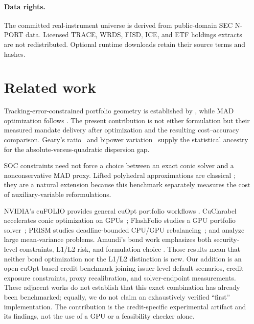 \documentclass[11pt,a4paper]{article}
\begin{document}
\paragraph{Data rights.} The committed real-instrument universe is derived
from public-domain SEC N-PORT data. Licensed TRACE, WRDS, FISD, ICE, and ETF
holdings extracts are not redistributed. Optional runtime downloads retain
their source terms and hashes.

\section{Related work}

Tracking-error-constrained portfolio geometry is established by
\citet{jorion2003tracking}, while MAD optimization follows
\citet{konno1991mad}. The present contribution is not either formulation but
their measured mandate delivery after optimization and the resulting
cost--accuracy comparison. Geary's ratio~\citep{geary1935ratio} and bipower
variation~\citep{barndorff2004bipower} supply the statistical ancestry for the
absolute-versus-quadratic dispersion gap.

SOC constraints need not force a choice between an exact conic solver and a
nonconservative MAD proxy. Lifted polyhedral approximations are classical
\citep{bental2001soc,vielma2008lifted}; they are a natural extension because
this benchmark separately measures the cost of auxiliary-variable
reformulations.

NVIDIA's cuFOLIO provides general cuOpt portfolio workflows
\citep{nvidia2026cufolio}. CuClarabel accelerates conic
optimization on GPUs~\citep{chen2024cuclarabel}; FlashFolio studies a GPU
portfolio solver~\citep{jiang2026flashfolio}; PRISM studies deadline-bounded
CPU/GPU rebalancing~\citep{ghosh2026prism}; and \citet{niu2026meanvariance}
analyze large mean-variance problems. Amundi's bond work emphasizes both
security-level constraints, L1/L2 risk, and formulation choice
\citep{benslimane2026bond,benslimane2023bondmip}. Those results mean that
neither bond optimization nor the L1/L2 distinction is new. Our addition is
an open cuOpt-based credit benchmark joining issuer-level default scenarios,
credit exposure constraints, proxy recalibration, and solver-endpoint
measurements. These adjacent works do not establish that this exact
combination has already been benchmarked; equally, we do not claim an
exhaustively verified ``first'' implementation. The contribution is the
credit-specific experimental artifact and its findings, not the use of a
GPU or a feasibility checker alone.
\end{document}
